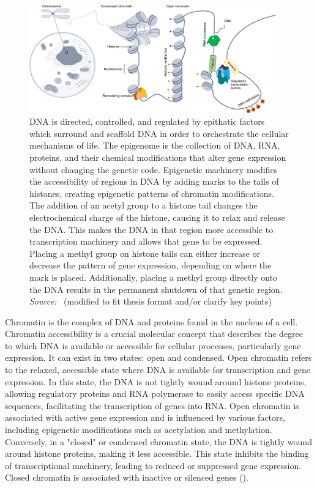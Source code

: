 \begin{figure}[!ht]
	\centering
	\includegraphics[width=0.95\textwidth]{chromatin_organization/fig}
	\vspace{0.1cm}
	\caption[DNA organization] {DNA is directed, controlled, and regulated by epithatic factors which surround and scaffold DNA in order to orchestrate the cellular mechanisms of life. The epigenome is the collection of DNA, RNA, proteins, and their chemical modifications that alter gene expression without changing the genetic code. Epigenetic machinery modifies the accessibility of regions in DNA by adding marks to the tails of histones, creating epigenetic patterns of chromatin modifications. The addition of an acetyl group to a histone tail changes the electrochemical charge of the histone, causing it to relax and release the DNA. This makes the DNA in that region more accessible to transcription machinery and allows that gene to be expressed. Placing a methyl group on histone tails can either increase or decrease the pattern of gene expression, depending on where the mark is placed. Additionally, placing a methyl group directly onto the DNA results in the permanent shutdown of that genetic region. \emph{Source:~\cite{heumos2023best}} (modified to fit thesis format and/or clarify key points)}
	\label{fig:chromatin_organization}
\end{figure}


Chromatin is the complex of DNA and proteins found in the nucleus of a cell. Chromatin accessibility is a crucial molecular concept that describes the degree to which DNA is available or accessible for cellular processes, particularly gene expression. It can exist in two states: open and condensed. Open chromatin refers to the relaxed, accessible state where DNA is available for transcription and gene expression. In this state, the DNA is not tightly wound around histone proteins, allowing regulatory proteins and RNA polymerase to easily access specific DNA sequences, facilitating the transcription of genes into RNA. Open chromatin is associated with active gene expression and is influenced by various factors, including epigenetic modifications such as acetylation and methylation. Conversely, in a "closed" or condensed chromatin state, the DNA is tightly wound around histone proteins, making it less accessible. This state inhibits the binding of transcriptional machinery, leading to reduced or suppressed gene expression. Closed chromatin is associated with inactive or silenced genes ().




